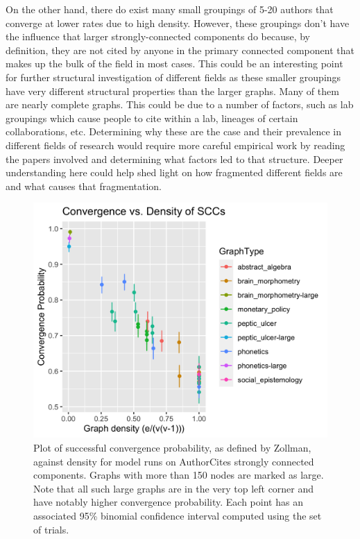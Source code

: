 On the other hand, there do exist many small groupings of 5-20 authors
that converge at lower rates due to high density. However, these
groupings don't have the influence that larger strongly-connected
components do because, by definition, they are not cited by anyone in
the primary connected component that makes up the bulk of the field in
most cases. This could be an interesting point for further structural
investigation of different fields as these smaller groupings have very
different structural properties than the larger graphs. Many of them are
nearly complete graphs. This could be due to a number of factors, such
as lab groupings which cause people to cite within a lab, lineages of
certain collaborations, etc. Determining why these are the case and
their prevalence in different fields of research would require more
careful empirical work by reading the papers involved and determining
what factors led to that structure. Deeper understanding here could help
shed light on how fragmented different fields are and what causes that
fragmentation.

\begin{figure}
\hypertarget{fig:convergeprobdensity}{%
\centering
\includegraphics{figures/converge_prb_density.png}
\caption{Plot of successful convergence probability, as defined by
Zollman, against density for model runs on AuthorCites strongly
connected components. Graphs with more than 150 nodes are marked as
large. Note that all such large graphs are in the very top left corner
and have notably higher convergence probability. Each point has an
associated 95\% binomial confidence interval computed using the set of
trials.}\label{fig:convergeprobdensity}
}
\end{figure}

